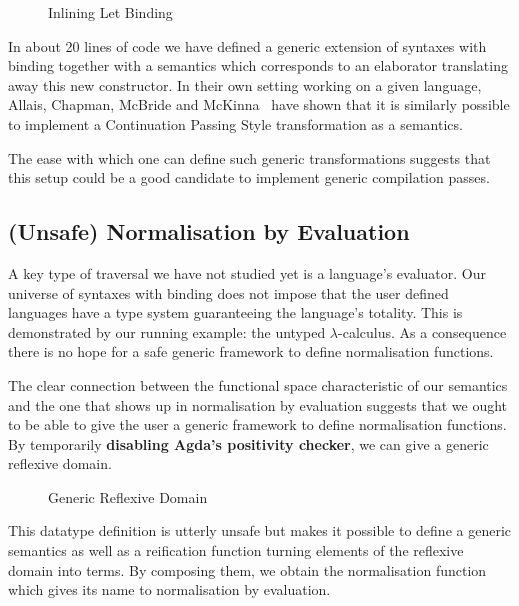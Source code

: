 \begin{figure}[h]
\begin{minipage}{0.45\textwidth}
\end{minipage}\hspace{2em}
\begin{minipage}{0.45\textwidth}
\end{minipage}
\caption{Inlining Let Binding}
\end{figure}

In about 20 lines of code we have defined a generic extension of
syntaxes with binding together with a semantics which corresponds
to an elaborator translating away this new constructor. In their
own setting working on a given language, Allais, Chapman, McBride
and McKinna~\citeyear{allais2017type} have shown that it is similarly
possible to implement a Continuation Passing Style transformation as
a semantics.

The ease with which one can define such generic transformations
suggests that this setup could be a good candidate to implement
generic compilation passes.

\subsection{(Unsafe) Normalisation by Evaluation}

A key type of traversal we have not studied yet is a language's
evaluator. Our universe of syntaxes with binding does not impose
that the user defined languages have a type system guaranteeing
the language's totality. This is demonstrated by our running
example: the untyped $\lambda$-calculus. As a consequence there
is no hope for a safe generic framework to define normalisation
functions.

The clear connection between the  functional space
characteristic of our semantics and the one that shows up in
normalisation by evaluation suggests that we ought to be able
to give the user a generic framework to define normalisation
functions. By temporarily \textbf{disabling Agda's positivity
checker}, we can give a generic reflexive domain.

\begin{figure}[h]
{\center {}}
\caption{Generic Reflexive Domain}
\end{figure}

This datatype definition is utterly unsafe but makes it possible
to define a generic  semantics as well as a reification
function turning elements of the reflexive domain into terms.
By composing them, we obtain the normalisation function which
gives its name to normalisation by evaluation.

